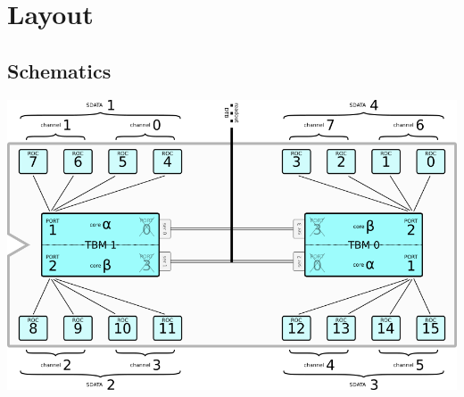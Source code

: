 \documentclass[9pt]{beamer}
\begin{document}
\section{Layout}
\subsection{Schematics}
\begin{frame}
	\begin{center}
		\includegraphics[width=\textwidth]{Schematics}
	\end{center}
\end{frame}
\end{document}
